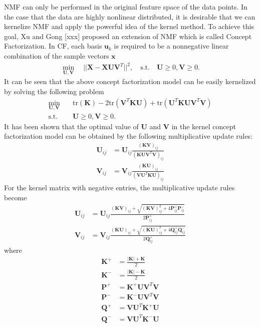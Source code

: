 \documentclass[10pt,journal,compsoc]{IEEEtran}
\newcommand{\st}{\mathrm{s.t.}}
\newcommand{\tr}{\mathrm{tr}}
\begin{document}
NMF can only be performed in the original feature space of the data points. In the case that the data are highly nonlinear distributed, it is desirable that we can kernelize NMF and apply the powerful idea of the kernel method. To achieve this goal, Xu and Gong [xxx] proposed an extension of NMF which is called Concept Factorization. In CF, each basis $\mathbf{u}_k$ is required to be a nonnegative linear combination of the sample vectors $\mathbf{x}$ 
\begin{align}
\min_{\mathbf{U}, \mathbf{V}} \quad ||\mathbf{X} - \mathbf{X} \mathbf{U} \mathbf{V}^T ||^2, \quad \st \quad \mathbf{U} \geq 0, \mathbf{V} \geq 0.
\end{align}
It can be seen that the above concept factorization model can be easily kernelized by solving the following problem
\begin{align}
\min_{\mathbf{U}, \mathbf{V}} \quad & \tr(\mathbf{K}) - 2 \tr(\mathbf{V}^T \mathbf{K} \mathbf{U}) + \tr(\mathbf{U}^T \mathbf{K} \mathbf{U} \mathbf{V}^T \mathbf{V}) \\
\st \quad & \mathbf{U} \geq 0, \mathbf{V} \geq 0. \nonumber
\end{align}
It has been shown that the optimal value of $\mathbf{U}$ and $\mathbf{V}$ in the kernel concept factorization model can be obtained by the following multiplicative update rules:
\begin{align}
\mathbf{U}_{ij} & = \mathbf{U}_{ij} \frac{(\mathbf{K} \mathbf{V})_{ij}}{(\mathbf{K} \mathbf{U} \mathbf{V}^{T} \mathbf{V})_{ij}} \\
\mathbf{V}_{ij} & = \mathbf{V}_{ij} \frac{(\mathbf{K} \mathbf{U})_{ij}}{(\mathbf{V} \mathbf{U}^T \mathbf{K} \mathbf{U})_{ij}}
\end{align}
For the kernel matrix with negative entries, the multiplicative update rules become
\begin{align}
\mathbf{U}_{ij} & = \mathbf{U}_{ij} \frac{(\mathbf{K} \mathbf{V})_{ij} + \sqrt{(\mathbf{K} \mathbf{V})_{ij}^2 + 4 \mathbf{P}_{ij}^{+} \mathbf{P}_{ij}^{-} }}{2 \mathbf{P}_{ij}^{+}} \\
\mathbf{V}_{ij} & = \mathbf{V}_{ij} \frac{(\mathbf{K} \mathbf{U})_{ij} + \sqrt{(\mathbf{K} \mathbf{U})_{ij}^2 + 4 \mathbf{Q}_{ij}^{+} \mathbf{Q}_{ij}^{-} }}{2 \mathbf{Q}_{ij}^{+}}
\end{align}
where
\begin{align}
\mathbf{K}^{+} &= \frac{|\mathbf{K}| + \mathbf{K}}{2}\\
\mathbf{K}^{-} &= \frac{|\mathbf{K}| - \mathbf{K}}{2}\\
\mathbf{P}^{+} &= \mathbf{K}^{+} \mathbf{U} \mathbf{V}^{T} \mathbf{V}\\
\mathbf{P}^{-} &= \mathbf{K}^{-} \mathbf{U} \mathbf{V}^{T} \mathbf{V}\\
\mathbf{Q}^{+} &= \mathbf{V} \mathbf{U}^T \mathbf{K}^{+} \mathbf{U} \\
\mathbf{Q}^{-} &= \mathbf{V} \mathbf{U}^T \mathbf{K}^{-} \mathbf{U}
\end{align}
\end{document}

